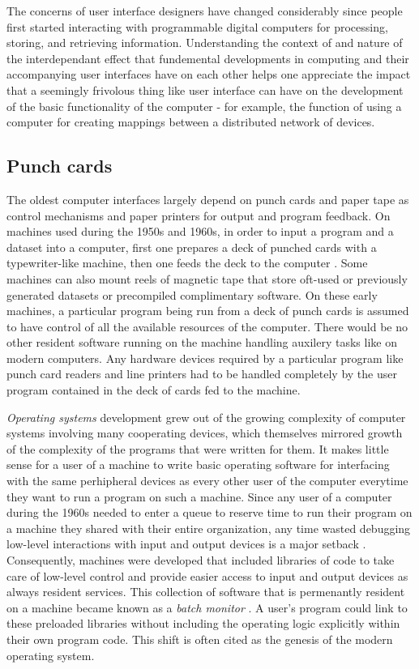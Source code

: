 The concerns of user interface designers have changed considerably since people first started interacting with programmable digital computers for processing, storing, and retrieving information. Understanding the context of and nature of the interdependant effect that fundemental developments in computing and their accompanying user interfaces have on each other helps one appreciate the impact that a seemingly frivolous thing like user interface can have on the development of the basic functionality of the computer - for example, the function  of using a computer for creating mappings between a distributed network of devices.  

\subsection{Punch cards}

The oldest computer interfaces largely depend on punch cards and paper tape as control mechanisms and paper printers for output and program feedback. On machines used during the 1950s and 1960s, in order to input a program and a dataset into a computer, first one prepares a deck of punched cards with a typewriter-like machine, then one feeds the deck to the computer \cite{oshistory2011}. Some machines can also mount reels of magnetic tape that store oft-used or previously generated datasets or precompiled complimentary software. On these early machines, a particular program being run from a deck of punch cards is assumed to have control of all the available resources of the computer. There would be no other resident software running on the machine handling auxilery tasks like on modern computers. Any hardware devices required by a particular program like punch card readers and line printers had to be handled completely by the user program contained in the deck of cards fed to the machine. 

\emph{Operating systems} development grew out of the growing complexity of computer systems involving many cooperating devices, which themselves mirrored growth of the complexity of the programs that were written for them. It makes little sense for a user of a machine to write basic operating software for interfacing with the same perhipheral devices as every other user of the computer everytime they want to run a program on such a machine. Since any user of a computer during the 1960s needed to enter a queue to reserve time to run their program on a machine they shared with their entire organization, any time wasted debugging low-level interactions with input and output devices is a major setback \cite{operatingsystems2010}. Consequently, machines were developed that included libraries of code to take care of low-level control and provide easier access to input and output devices as always resident services. This collection of software that is permenantly resident on a machine became known as a \emph{batch monitor} \cite{os2000}. A user's program could link to these preloaded libraries without including the operating logic explicitly within their own program code. This shift is often cited as the genesis of the modern operating system.

